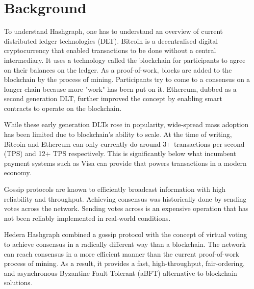 \section{Background}

To understand Hashgraph, one has to understand an overview of current distributed ledger technologies (DLT). Bitcoin\cite{nakamoto2008peer} is a decentralised digital cryptocurrency that enabled transactions to be done without a central intermediary. It uses a technology called the blockchain for participants to agree on their balances on the ledger. As a proof-of-work, blocks are added to the blockchain by the process of mining. Participants try to come to a consensus on a longer chain because more "work" has been put on it. Ethereum\cite{wood2014ethereum}, dubbed as a second generation DLT, further improved the concept by enabling smart contracts to operate on the blockchain.

While these early generation DLTs rose in popularity, wide-spread mass adoption has been limited due to blockchain's ability to scale. At the time of writing, Bitcoin and Ethereum can only currently do around 3+ transactions-per-second (TPS)\cite{bitcointps} and 12+ TPS respectively\cite{ethereumtps}. This is significantly below what incumbent payment systems such as Visa can provide\cite{visafactsheet} that powers transactions in a modern economy.

Gossip protocols are known to efficiently broadcast information with high reliability and throughput\cite{birman}. Achieving consensus was historically done by sending votes across the network\cite{berman1989towards}. Sending votes across is an expensive operation that has not been reliably implemented in real-world conditions.

Hedera Hashgraph\cite{baird2016} combined a gossip protocol with the concept of virtual voting to achieve consensus in a radically different way than a blockchain. The network can reach consensus in a more efficient manner than the current proof-of-work process of mining. As a result, it provides a fast, high-throughput, fair-ordering, and asynchronous Byzantine Fault Tolerant (aBFT) alternative to blockchain solutions.
